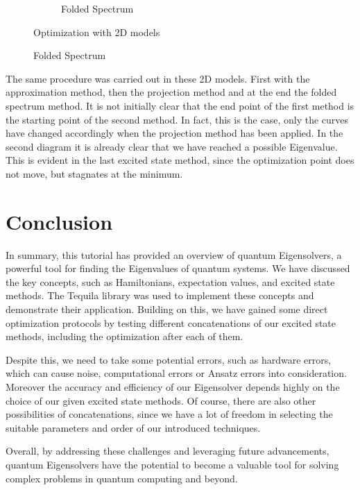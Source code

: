 \documentclass[
  letterpaper,
  DIV=11,
  numbers=noendperiod]{scrartcl}
\begin{document}
\begin{figure}
\begin{minipage}{0.33\linewidth}
\begin{figure}[H]
{}

\caption{\label{fig-hanno}Folded Spectrum}

\end{figure}%

\end{minipage}%
\newline
\begin{minipage}{0.33\linewidth}
Optimization with 2D models\end{minipage}%

\end{figure}%

The same procedure was carried out in these 2D models. First with the
approximation method, then the projection method and at the end the
folded spectrum method. It is not initially clear that the end point of
the first method is the starting point of the second method. In fact,
this is the case, only the curves have changed accordingly when the
projection method has been applied. In the second diagram it is already
clear that we have reached a possible Eigenvalue. This is evident in the
last excited state method, since the optimization point does not move,
but stagnates at the minimum.

\section{Conclusion}\label{conclusion}

In summary, this tutorial has provided an overview of quantum
Eigensolvers, a powerful tool for finding the Eigenvalues of quantum
systems. We have discussed the key concepts, such as Hamiltonians,
expectation values, and excited state methods. The Tequila library was
used to implement these concepts and demonstrate their application.
Building on this, we have gained some direct optimization protocols by
testing different concatenations of our excited state methods, including
the optimization after each of them.

Despite this, we need to take some potential errors, such as hardware
errors, which can cause noise, computational errors or Ansatz errors
into consideration. Moreover the accuracy and efficiency of our
Eigensolver depends highly on the choice of our given excited state
methods. Of course, there are also other possibilities of
concatenations, since we have a lot of freedom in selecting the suitable
parameters and order of our introduced techniques.

Overall, by addressing these challenges and leveraging future
advancements, quantum Eigensolvers have the potential to become a
valuable tool for solving complex problems in quantum computing and
beyond.
\end{document}
